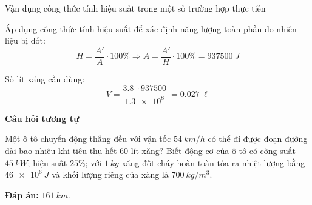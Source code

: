 \begin{dang}{Vận dụng công thức tính hiệu suất trong một số trường hợp thực tiễn}
{		Áp dụng công thức tính hiệu suất để xác định năng lượng toàn phần do nhiên liệu bị đốt:
		$$H=\dfrac{A'}{A} \cdot 100\% \Rightarrow A=\dfrac{A'}{H} \cdot 100\% = \SI{937500}{J}$$
		
		Số lít xăng cần dùng:
		$$V=\dfrac{\SI{3.8}{} \cdot \SI{937500}{}}{\SI{1.3e8}{}} = \SI{0.027}{\ell}$$
		
		\begin{center}
			\textbf{Câu hỏi tương tự}
		\end{center}
		
		Một ô tô chuyển động thẳng đều với vận tốc $\SI{54}{km/h}$ có thể đi được đoạn đường dài bao nhiêu khi tiêu thụ hết 60 lít xăng? Biết động cơ của ô tô có công suất $\SI{45}{kW}$; hiệu suất $25\%$; với $\SI{1}{kg}$ xăng đốt cháy hoàn toàn tỏa ra nhiệt lượng bằng $\SI{46e6}{J}$ và khối lượng riêng của xăng là $\SI{700}{kg/m^3}$.
		
		\textbf{Đáp án:} $\SI{161}{km}$.
	}
\end{dang}